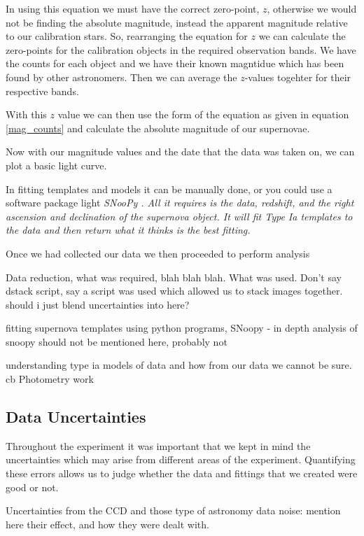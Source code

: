 \documentclass[twocolumn]{revtex4}
\begin{document}
In using this equation we must have the correct zero-point, $z$, otherwise we would not be finding the absolute magnitude, instead the apparent magnitude relative to our calibration stars. So, rearranging the equation for $z$ we can calculate the zero-points for the calibration objects in the required observation bands. We have the counts for each object and we have their known magntidue which has been found by other astronomers. Then we can average the $z$-values togehter for their respective bands. 

With this $z$ value we can then use the form of the equation as given in equation \ref{mag_counts} and calculate the absolute magnitude of our supernovae.

Now with our magnitude values and the date that the data was taken on, we can plot a basic light curve. 

In fitting templates and models it can be manually done, or you could use a software package light \em{SNooPy }\em. All it requires is the data, redshift, and the right ascension and declination of the supernova object. It will fit Type Ia templates to the data and then return what it thinks is the best fitting.

Once we had collected our data we then proceeded to perform analysis

Data reduction, what was required, blah blah blah. What was used. Don't say dstack script, say a script was used which allowed us to stack images together. should i just blend uncertainties into here? 

fitting supernova templates using python programs, SNoopy - in depth analysis of snoopy should not be mentioned here, probably not

understanding type ia models of data and how from our data we cannot be sure.  
 cb
Photometry work 

\vspace{-3ex}
\subsection{Data Uncertainties}
\vspace{-2ex}

Throughout the experiment it was important that we kept in mind the uncertainties which may arise from different areas of the experiment. Quantifying these errors allows us to judge whether the data and fittings that we created were good or not. 

Uncertainties from the CCD and those type of astronomy data noise: mention here their effect, and how they were dealt with. 
\end{document}
